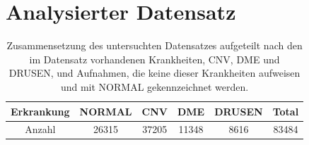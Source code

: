\section{Analysierter Datensatz}

 \begin{table}[!h]
\centering
\caption{Zusammensetzung des untersuchten Datensatzes aufgeteilt nach den im Datensatz vorhandenen Krankheiten, CNV, DME und DRUSEN, und Aufnahmen, die keine dieser Krankheiten aufweisen und mit NORMAL gekennzeichnet werden.}
\label{tab:datacomp}
\begin{tabular}{|c|cccc|c|} 
\hline
Erkrankung & NORMAL & CNV & DME & DRUSEN & Total \\
\hline
Anzahl &26315 & 37205 & 11348 & 8616 & 83484 \\
\hline
 \end{tabular}
\end{table}



